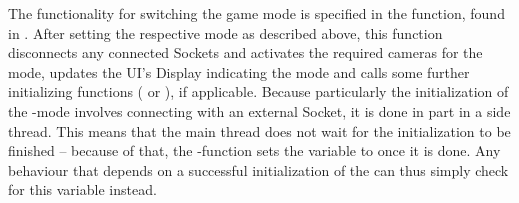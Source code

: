The functionality for switching the game mode is specified in the  function, found in . After setting the respective mode as described above, this function disconnects any connected Sockets and  activates the required cameras for the mode, updates the UI's Display indicating the mode and calls some further initializing functions ( or ), if applicable. Because particularly the initialization of the -mode involves connecting with an external Socket, it is done in part in a side thread. This means that the main thread does not wait for the initialization to be finished -- because of that, the -function sets the variable  to  once it is done. Any behaviour that depends on a successful initialization of the can thus simply check for this variable instead.

